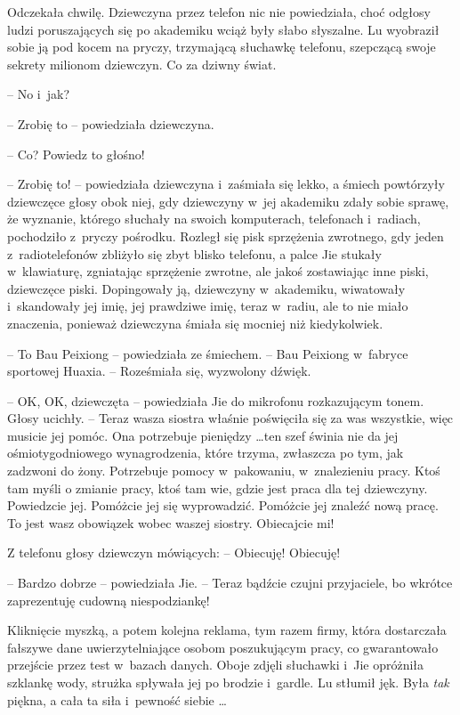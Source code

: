 \documentclass[oneside,polish,11pt,rmheadings]{mwbk}
\begin{document}
Odczekała chwilę. Dziewczyna przez telefon nic nie powiedziała, choć odgłosy ludzi poruszających się po akademiku wciąż były słabo słyszalne. Lu wyobraził sobie ją pod kocem na pryczy, trzymającą słuchawkę telefonu, szepczącą swoje sekrety milionom dziewczyn. Co za dziwny świat. 

-- No i~jak? 

-- Zrobię to -- powiedziała dziewczyna. 

-- Co? Powiedz to głośno! 

-- Zrobię to! -- powiedziała dziewczyna i~zaśmiała się lekko, a śmiech powtórzyły dziewczęce głosy obok niej, gdy dziewczyny w~jej akademiku zdały sobie sprawę, że wyznanie, którego słuchały na swoich komputerach, telefonach i~radiach, pochodziło z~pryczy pośrodku. Rozległ się pisk sprzężenia zwrotnego, gdy jeden z~radiotelefonów zbliżyło się zbyt blisko telefonu, a palce Jie stukały w~klawiaturę, zgniatając sprzężenie zwrotne, ale jakoś zostawiając inne piski, dziewczęce piski. Dopingowały ją, dziewczyny w~akademiku, wiwatowały i~skandowały jej imię, jej prawdziwe imię, teraz w~radiu, ale to nie miało znaczenia, ponieważ dziewczyna śmiała się mocniej niż kiedykolwiek.

-- To Bau Peixiong -- powiedziała ze śmiechem. -- Bau Peixiong w~fabryce sportowej Huaxia. -- Roześmiała się, wyzwolony dźwięk.

-- OK, OK, dziewczęta -- powiedziała Jie do mikrofonu rozkazującym tonem. Głosy ucichły. -- Teraz wasza siostra właśnie poświęciła się za was wszystkie, więc musicie jej pomóc. Ona potrzebuje pieniędzy  \ldots  ten szef świnia nie da jej ośmiotygodniowego wynagrodzenia, które trzyma, zwłaszcza po tym, jak zadzwoni do żony. Potrzebuje pomocy w~pakowaniu, w~znalezieniu pracy. Ktoś tam myśli o zmianie pracy, ktoś tam wie, gdzie jest praca dla tej dziewczyny. Powiedzcie jej. Pomóżcie jej się wyprowadzić. Pomóżcie jej znaleźć nową pracę. To jest wasz obowiązek wobec waszej siostry. Obiecajcie mi!

Z telefonu głosy dziewczyn mówiących: -- Obiecuję! Obiecuję! 

-- Bardzo dobrze -- powiedziała Jie. -- Teraz bądźcie czujni przyjaciele, bo wkrótce zaprezentuję cudowną niespodziankę! 

Kliknięcie myszką, a potem kolejna reklama, tym razem firmy, która dostarczała fałszywe dane uwierzytelniające osobom poszukującym pracy, co gwarantowało przejście przez test w~bazach danych. Oboje zdjęli słuchawki i~Jie opróżniła szklankę wody, strużka spływała jej po brodzie i~gardle. Lu stłumił jęk. Była \textit{tak }piękna, a cała ta siła i~pewność siebie \ldots 
\end{document}
